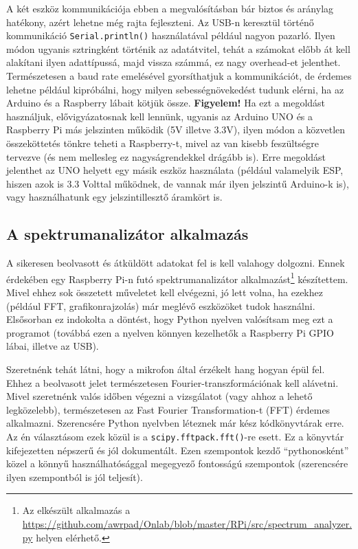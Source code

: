 \documentclass[12pt,a4paper]{article}
\begin{document}
      A két eszköz kommunikációja ebben a megvalósításban bár biztos és aránylag hatékony, azért lehetne még rajta fejleszteni. Az USB-n keresztül történő kommunikáció \texttt{Serial.println()} használatával például nagyon pazarló. Ilyen módon ugyanis sztringként történik az adatátvitel, tehát a számokat előbb át kell alakítani ilyen adattípussá, majd vissza számmá, ez nagy overhead-et jelenthet. Természetesen a baud rate emelésével gyorsíthatjuk a kommunikációt, de érdemes lehetne például kipróbálni, hogy milyen sebességnövekedést tudunk elérni, ha az Arduino és a Raspberry lábait kötjük össze. \textbf{Figyelem!} Ha ezt a megoldást használjuk, elővigyázatosnak kell lennünk, ugyanis az Arduino UNO és a Raspberry Pi más jelszinten működik (5V illetve 3.3V), ilyen módon a közvetlen összeköttetés tönkre teheti a Raspberry-t, mivel az van kisebb feszültségre tervezve (és nem mellesleg ez nagyságrendekkel drágább is). Erre megoldást jelenthet az UNO helyett egy másik eszköz használata (például valamelyik ESP, hiszen azok is 3.3 Volttal működnek, de vannak már ilyen jelszintű Arduino-k is), vagy használhatunk egy jelszintillesztő áramkört is.

    \subsection{A spektrumanalizátor alkalmazás}
      A sikeresen beolvasott és átküldött adatokat fel is kell valahogy dolgozni. Ennek érdekében egy Raspberry Pi-n futó spektrumanalizátor alkalmazást\footnote{Az elkészült alkalmazás a \url{https://github.com/awrpad/Onlab/blob/master/RPi/src/spectrum_analyzer.py} helyen elérhető.} készítettem. Mivel ehhez sok összetett műveletet kell elvégezni, jó lett volna, ha ezekhez (például FFT, grafikonrajzolás) már meglévő eszközöket tudok használni. Elsősorban ez indokolta a döntést, hogy Python nyelven valósítsam meg ezt a programot (továbbá ezen a nyelven könnyen kezelhetők a Raspberry Pi GPIO lábai, illetve az USB).

      Szeretnénk tehát látni, hogy a mikrofon által érzékelt hang hogyan épül fel. Ehhez a beolvasott jelet természetesen Fourier-transzformációnak kell alávetni. Mivel szeretnénk valós időben végezni a vizsgálatot (vagy ahhoz a lehető legközelebb), természetesen az Fast Fourier Transformation-t (FFT) érdemes alkalmazni. Szerencsére Python nyelvben léteznek már kész kódkönyvtárak erre. Az én választásom ezek közül is a \texttt{scipy.fftpack.fft()}-re esett. Ez a könyvtár kifejezetten népszerű és jól dokumentált. Ezen szempontok kezdő ``pythonosként'' közel a könnyű használhatósággal megegyező fontosságú szempontok (szerencsére ilyen szempontból is jól teljesít).
\end{document}
